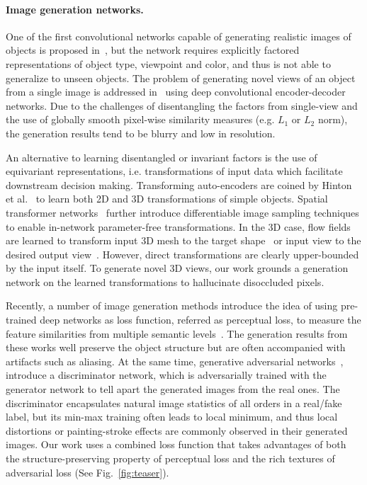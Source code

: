 \documentclass[10pt,twocolumn,letterpaper]{article}
\begin{document}
\vspace{-1mm}
\paragraph{Image generation networks.}
One of the first convolutional networks capable of generating realistic images of objects is proposed in~\cite{Dosovitskiy_cvpr2015}, but the network requires explicitly factored representations of object type, viewpoint and color, and thus is not able to generalize to unseen objects. 
The problem of generating novel views of an object from a single image is addressed in~\cite{yang_nips2015,kulkarni_nips2015,tatarchenko_eccv2016} using deep convolutional encoder-decoder networks. Due to the challenges of disentangling the factors from single-view and the use of globally smooth pixel-wise similarity measures (e.g. $L_1$ or $L_2$ norm), the generation results tend to be blurry and low in resolution. 

An alternative to learning disentangled or invariant factors is the use of equivariant representations, i.e. transformations of input data which facilitate downstream decision making. Transforming auto-encoders are coined by Hinton et al.~\cite{hinton2011transforming} to learn both 2D and 3D transformations of simple objects. Spatial transformer networks~\cite{jaderberg_NIPS2015} further introduce differentiable image sampling techniques to enable in-network parameter-free transformations. In the 3D case, flow fields are learned to transform input 3D mesh to the target shape~\cite{yumer2016learning} or input view to the desired output view~\cite{Zhou_eccv2016}. However, direct transformations are clearly upper-bounded by the input itself. To generate novel 3D views, our work grounds a generation network on the learned transformations to hallucinate disoccluded pixels.

Recently, a number of image generation methods introduce the idea of using pre-trained deep networks as loss function, referred as perceptual loss, to measure the feature similarities from multiple semantic levels~\cite{johnson_eccv2016,larsen_icml2016,ulyanov_icml2016,lamb2016discriminative}. The generation results from these works well preserve the object structure but are often accompanied with artifacts such as aliasing. At the same time, generative adversarial networks~\cite{Goodfellow_nips2014,Radford_iclr2016}, introduce a discriminator network, which is adversarially trained with the generator network to tell apart the generated images from the real ones. The discriminator encapsulates natural image statistics of all orders in a real/fake label, but its min-max training often leads to local minimum, and thus local distortions or painting-stroke effects are commonly observed in their generated images. Our work uses a combined loss function that takes advantages of both the structure-preserving property of perceptual loss and the rich textures of adversarial loss (See Fig.~\ref{fig:teaser}).
\end{document}
